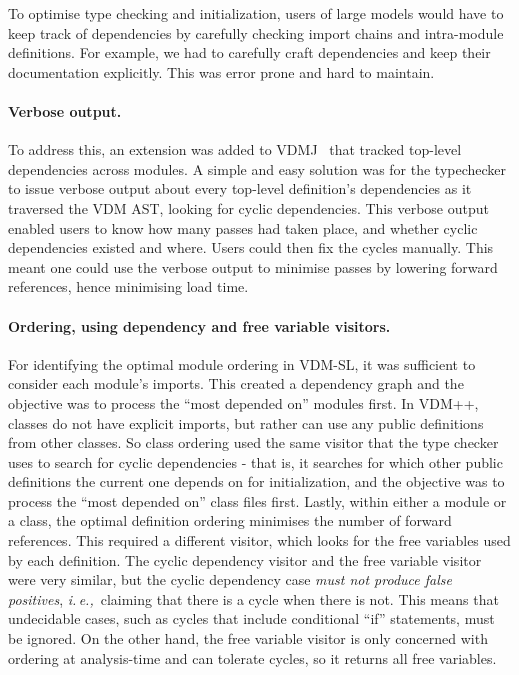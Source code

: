 \documentclass[runningheads,a4paper]{llncs}
\newcommand{\ie}{{\em i.\,e.,\/}}
\begin{document}
To optimise type checking and initialization, users of large models would have to keep track of dependencies by carefully checking import chains and intra-module definitions. For example, we had to carefully craft dependencies and keep their documentation explicitly. This was error prone and hard to maintain. 

\paragraph*{Verbose output.}
%
To address this, an extension was added to VDMJ~\cite{Battle09} that tracked top-level dependencies across modules. A simple and easy solution was for the typechecker to issue verbose output about every top-level definition's dependencies as it traversed the VDM AST, looking for cyclic dependencies. This verbose output enabled users to know how many passes had taken place, and whether cyclic dependencies existed and where. Users could then fix the cycles manually. This meant one could use the verbose output to minimise passes by lowering forward references, hence minimising load time.   

\paragraph*{Ordering, using dependency and free variable visitors.}
%
For identifying the optimal module ordering in VDM-SL, it was sufficient to consider each module's imports. This created a dependency graph and the objective was to process the ``most depended on'' modules first. In VDM++, classes do not have explicit imports, but rather can use any public definitions from other classes. So class ordering used the same visitor that the type checker uses to search for cyclic dependencies - that is, it searches for which other public definitions the current one depends on for initialization, and the objective was to process the ``most depended on'' class files first. Lastly, within either a module or a class, the optimal definition ordering minimises the number of forward references. This required a different visitor, which looks for the free variables used by each definition. The cyclic dependency visitor and the free variable visitor were very similar, but the cyclic dependency case \emph{must not produce false positives}, \ie~claiming that there is a cycle when there is not. This means that undecidable cases, such as cycles that include conditional ``if'' statements, must be ignored. On the other hand, the free variable visitor is only concerned with ordering at analysis-time and can tolerate cycles, so it returns all free variables.
\end{document}
